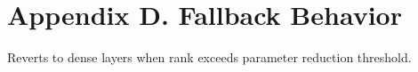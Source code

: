 \section*{Appendix D. Fallback Behavior}Reverts to dense layers when rank exceeds parameter reduction threshold.
